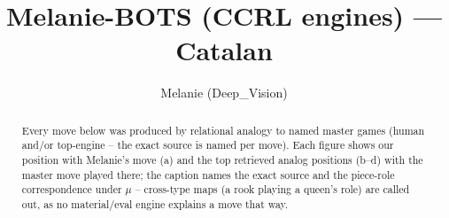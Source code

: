 \documentclass[11pt]{article}
\title{Melanie-BOTS (CCRL engines) — Catalan}
\author{Melanie (Deep\_Vision)}
\date{}
\begin{document}
\maketitle

\begin{abstract}Every move below was produced by relational analogy to named master games (human and/or top-engine -- the exact source is named per move). Each figure shows our position with Melanie's move (a) and the top retrieved analog positions (b--d) with the master move played there; the caption names the exact source and the piece-role correspondence under $\mu$ -- cross-type maps (a rook playing a queen's role) are called out, as no material/eval engine explains a move that way.\end{abstract}

\begin{figure}[p]\centering
\begin{subfigure}{0.46\textwidth}\centering
\resizebox{\linewidth}{!}{%
\newchessgame
\chessboard[
  setfen={rnbq1rk1/ppp1bppp/4pn2/4N3/2pP4/6P1/PP2PPBP/RNBQ1RK1 b - - 1 7},
  showmover=false,
  pgfstyle=straightmove, color=movearrow, markmove={f6-d5}
]}
\caption{}
\end{subfigure}\hfill
\begin{subfigure}{0.46\textwidth}\centering
\resizebox{\linewidth}{!}{%
\newchessgame
\chessboard[
  setfen={rnbq1rk1/pp2bppp/2p1pn2/4N3/2pP1B2/6P1/PP2PPBP/RN1Q1RK1 b - - 1 9},
  showmover=false,
  pgfstyle=straightmove, color=movearrow, markmove={f6-d5}
]}
\caption{}
\end{subfigure}
\\[4pt]
\begin{subfigure}{0.46\textwidth}\centering
\resizebox{\linewidth}{!}{%
\newchessgame
\chessboard[
  setfen={rnbq1rk1/pp2bppp/2p1pn2/4N3/2pP1B2/6P1/PP2PPBP/RN1Q1RK1 b - - 1 9},
  showmover=false,
  pgfstyle=straightmove, color=movearrow, markmove={f6-d5}
]}
\caption{}
\end{subfigure}\hfill
\begin{subfigure}{0.46\textwidth}\centering
\resizebox{\linewidth}{!}{%
\newchessgame
\chessboard[
  setfen={rnbq1rk1/pp2bppp/2p1pn2/4N3/2pP1B2/6P1/PP2PPBP/RN1Q1RK1 b - - 1 9},
  showmover=false,
  pgfstyle=straightmove, color=movearrow, markmove={f6-d5}
]}
\caption{}
\end{subfigure}

\end{figure}
\end{document}
